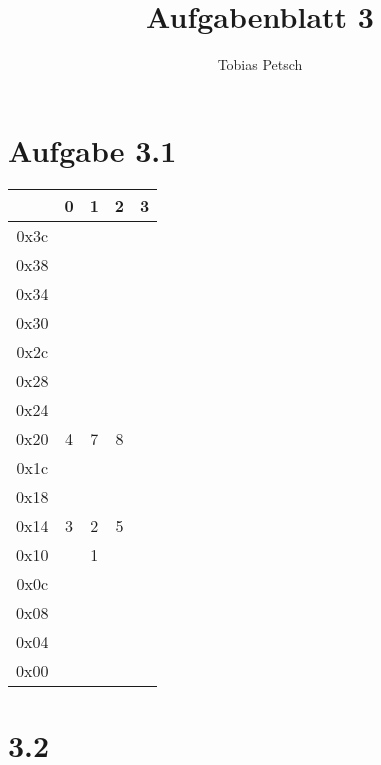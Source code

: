 \documentclass[a4paper,12pt]{article}
\title{Aufgabenblatt 3}
\author{Tobias Petsch}
\date{}
\begin{document}
\maketitle

\section*{Aufgabe 3.1}

\begin{table}[h!]
\centering
\begin{tabular}{|c|c|c|c|c|}
\hline
    & 0 & 1 & 2 & 3 \\ \hline
0x3c  &          &          &          &          \\ \hline
0x38  &          &          &          &          \\ \hline
0x34  &          &          &          &          \\ \hline
0x30  &          &          &          &          \\ \hline
0x2c  &          &          &          &          \\ \hline
0x28  &          &          &          &          \\ \hline
0x24  &          &          &          &          \\ \hline
0x20  &     4     &    7      &    8      &          \\ \hline
0x1c  &          &          &          &          \\ \hline
0x18  &          &          &          &          \\ \hline
0x14  &     3     &     2     &    5      &          \\ \hline
0x10  &          &     1     &          &          \\ \hline
0x0c  &          &          &          &          \\ \hline
0x08  &          &          &          &          \\ \hline
0x04  &          &          &          &          \\ \hline
0x00  &          &          &          &          \\ \hline
\end{tabular}

\end{table}

\section*{3.2}
\end{document}
